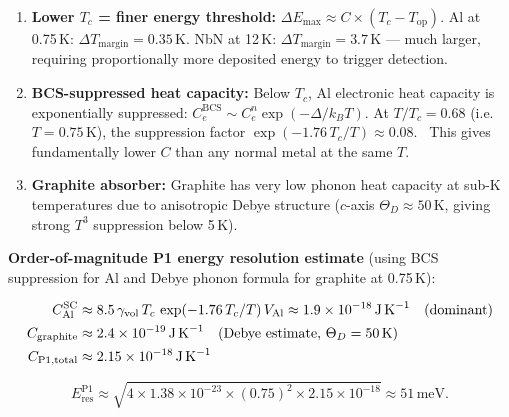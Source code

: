 \begin{enumerate}
  \item \textbf{Lower $T_c$ = finer energy threshold:}
    $\Delta E_\mathrm{max} \approx C \times (T_c - T_\mathrm{op})$.
    Al at 0.75\,K: $\Delta T_\mathrm{margin} = 0.35$\,K.
    NbN at 12\,K: $\Delta T_\mathrm{margin} = 3.7$\,K --- much larger,
    requiring proportionally more deposited energy to trigger detection.

  \item \textbf{BCS-suppressed heat capacity:}
    Below $T_c$, Al electronic heat capacity is exponentially suppressed:
    $C_e^\mathrm{BCS} \sim C_e^n \exp(-\Delta/k_B T)$.
    At $T/T_c = 0.68$ (i.e.\ $T = 0.75$\,K), the suppression factor
    $\exp(-1.76\,T_c/T) \approx 0.08$.~\cite{Richards1994}
    This gives fundamentally lower $C$ than any normal metal at the same $T$.

  \item \textbf{Graphite absorber:}
    Graphite has very low phonon heat capacity at sub-K temperatures due to
    anisotropic Debye structure ($c$-axis $\Theta_D \approx 50$\,K, giving
    strong $T^3$ suppression below 5\,K).
\end{enumerate}

\textbf{Order-of-magnitude P1 energy resolution estimate}
(using BCS suppression for Al and Debye phonon formula for graphite at 0.75\,K):

\begin{align}
  C_\mathrm{Al}^\mathrm{SC} &\approx
    8.5\,\gamma_\mathrm{vol}\,T_c\,\exp(-1.76\,T_c/T)\,V_\mathrm{Al}
    \approx 1.9 \times 10^{-18}\,\text{J\,K}^{-1} \quad\text{(dominant)} \notag \\
  C_\mathrm{graphite} &\approx 2.4 \times 10^{-19}\,\text{J\,K}^{-1}
    \quad\text{(Debye estimate, $\Theta_D = 50$\,K)} \notag \\
  C_\mathrm{P1,total} &\approx 2.15 \times 10^{-18}\,\text{J\,K}^{-1} \notag
\end{align}

\begin{equation}
  E_\mathrm{res}^\mathrm{P1}
  \approx \sqrt{4 \times 1.38 \times 10^{-23} \times (0.75)^2 \times 2.15 \times 10^{-18}}
  \approx 51\,\text{meV}.
  \label{eq:q7_E_P1}
\end{equation}

